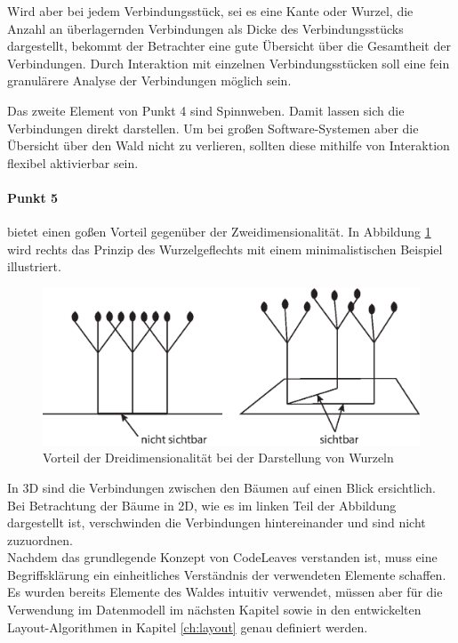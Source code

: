 Wird aber bei jedem Verbindungsstück, sei es eine Kante oder Wurzel, die Anzahl an überlagernden Verbindungen als Dicke des Verbindungsstücks dargestellt, bekommt der Betrachter eine gute Übersicht über die Gesamtheit der Verbindungen. Durch Interaktion mit einzelnen Verbindungsstücken soll eine fein granulärere Analyse der Verbindungen möglich sein.

Das zweite Element von Punkt 4 sind Spinnweben. Damit lassen sich die Verbindungen direkt darstellen. Um bei großen Software-Systemen aber die Übersicht über den Wald nicht zu verlieren, sollten diese mithilfe von Interaktion flexibel aktivierbar sein.

\paragraph{Punkt 5} bietet einen goßen Vorteil gegenüber der Zweidimensionalität. In Abbildung \ref{fig:3d-advantage} wird rechts das Prinzip des Wurzelgeflechts mit einem minimalistischen Beispiel illustriert.

\begin{figure}[htb]
  \includegraphics[width=.8\textwidth]{figures/3d-advantage}
  \caption{Vorteil der Dreidimensionalität bei der Darstellung von Wurzeln}
  \label{fig:3d-advantage}
\end{figure}

In 3D sind die Verbindungen zwischen den Bäumen auf einen Blick ersichtlich. Bei Betrachtung der Bäume in 2D, wie es im linken Teil der Abbildung dargestellt ist, verschwinden die Verbindungen hintereinander und sind nicht zuzuordnen.\\

Nachdem das grundlegende Konzept von CodeLeaves verstanden ist, muss eine Begriffsklärung ein einheitliches Verständnis der verwendeten Elemente schaffen. Es wurden bereits Elemente des Waldes intuitiv verwendet, müssen aber für die Verwendung im Datenmodell im nächsten Kapitel sowie in den entwickelten Layout-Algorithmen in Kapitel \ref{ch:layout} genau definiert werden.

